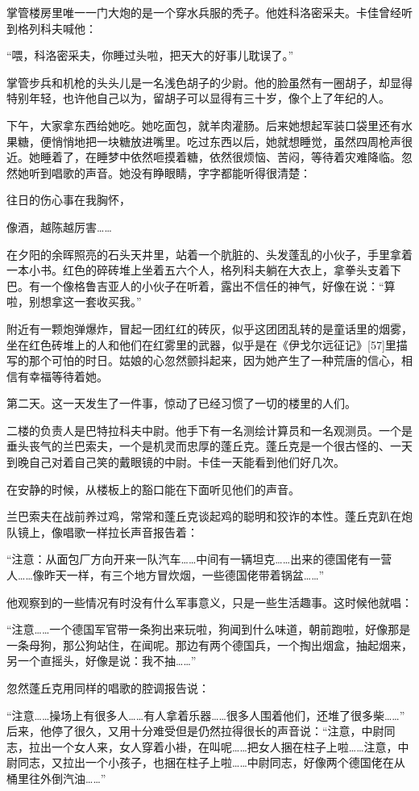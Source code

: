 掌管楼房里唯一一门大炮的是一个穿水兵服的秃子。他姓科洛密采夫。卡佳曾经听到格列科夫喊他：

“喂，科洛密采夫，你睡过头啦，把天大的好事儿耽误了。”

掌管步兵和机枪的头头儿是一名浅色胡子的少尉。他的脸虽然有一圈胡子，却显得特别年轻，也许他自己以为，留胡子可以显得有三十岁，像个上了年纪的人。

下午，大家拿东西给她吃。她吃面包，就羊肉灌肠。后来她想起军装口袋里还有水果糖，便悄悄地把一块糖放进嘴里。吃过东西以后，她就想睡觉，虽然四周枪声很近。她睡着了，在睡梦中依然咂摸着糖，依然很烦恼、苦闷，等待着灾难降临。忽然她听到唱歌的声音。她没有睁眼睛，字字都能听得很清楚：

往日的伤心事在我胸怀，

像酒，越陈越厉害……

在夕阳的余晖照亮的石头天井里，站着一个肮脏的、头发蓬乱的小伙子，手里拿着一本小书。红色的碎砖堆上坐着五六个人，格列科夫躺在大衣上，拿拳头支着下巴。有一个像格鲁吉亚人的小伙子在听着，露出不信任的神气，好像在说：“算啦，别想拿这一套收买我。”

附近有一颗炮弹爆炸，冒起一团红红的砖灰，似乎这团团乱转的是童话里的烟雾，坐在红色砖堆上的人和他们在红雾里的武器，似乎是在《伊戈尔远征记》[57]里描写的那个可怕的时日。姑娘的心忽然颤抖起来，因为她产生了一种荒唐的信心，相信有幸福等待着她。

第二天。这一天发生了一件事，惊动了已经习惯了一切的楼里的人们。

二楼的负责人是巴特拉科夫中尉。他手下有一名测绘计算员和一名观测员。一个是垂头丧气的兰巴索夫，一个是机灵而忠厚的蓬丘克。蓬丘克是一个很古怪的、一天到晚自己对着自己笑的戴眼镜的中尉。卡佳一天能看到他们好几次。

在安静的时候，从楼板上的豁口能在下面听见他们的声音。

兰巴索夫在战前养过鸡，常常和蓬丘克谈起鸡的聪明和狡诈的本性。蓬丘克趴在炮队镜上，像唱歌一样拉长声音报告着：

“注意：从面包厂方向开来一队汽车……中间有一辆坦克……出来的德国佬有一营人……像昨天一样，有三个地方冒炊烟，一些德国佬带着锅盆……”

他观察到的一些情况有时没有什么军事意义，只是一些生活趣事。这时候他就唱：

“注意……一个德国军官带一条狗出来玩啦，狗闻到什么味道，朝前跑啦，好像那是一条母狗，那公狗站住，在闻呢。那边有两个德国兵，一个掏出烟盒，抽起烟来，另一个直摇头，好像是说：我不抽……”

忽然蓬丘克用同样的唱歌的腔调报告说：

“注意……操场上有很多人……有人拿着乐器……很多人围着他们，还堆了很多柴……” 后来，他停了很久，又用十分难受但是仍然拉得很长的声音说：“注意，中尉同志，拉出一个女人来，女人穿着小褂，在叫呢……把女人捆在柱子上啦……注意，中尉同志，又拉出一个小孩子，也捆在柱子上啦……中尉同志，好像两个德国佬在从桶里往外倒汽油……”

